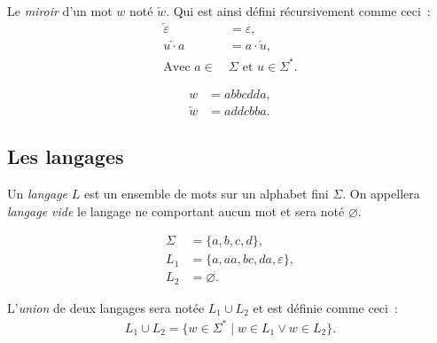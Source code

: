 \begin{definition}
  Le \textit{miroir} d'un mot \(w\) noté \(\overleftarrow{w}\). Qui est ainsi
  défini récursivement comme ceci~:
  \begin{align*}
    \overleftarrow{\varepsilon} &= \varepsilon, \\
    \overleftarrow{u \cdot a} &= a \cdot \overleftarrow{u}, \\
    \text{Avec } a \in~&\Sigma \text{ et } u \in \Sigma^*.
  \end{align*}
\end{definition}

\begin{example}
  \vspace{-\baselineskip}
  \begin{align*}
    w &= abbcdda, \\
    \overleftarrow{w} &= addcbba.
  \end{align*}
\end{example}

\subsection{Les langages}

\begin{definition}[Langage]
  Un \textit{langage} \(L\) est un ensemble de mots sur un alphabet fini
  \(\Sigma\). On appellera \textit{langage vide} le langage ne comportant
  aucun mot et sera noté \(\varnothing\).
\end{definition}

\begin{example}
  \vspace{-\baselineskip}
  \begin{align*}
    \Sigma &= \{a, b, c, d\}, \\
    L_1 &= \{a, aa, bc, da, \varepsilon\}, \\
    L_2 &= \varnothing.
  \end{align*}
\end{example}

\begin{definition}
  L'\textit{union} de deux langages sera notée \(L_1 \cup L_2\) et est définie
  comme ceci~:
  \begin{gather*}
      L_1 \cup L_2 = \{w \in \Sigma ^ * \mid w \in L_1 \lor w \in L_2\}.
  \end{gather*}
\end{definition}

